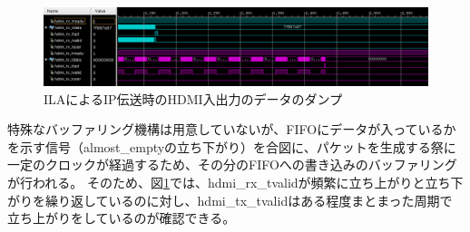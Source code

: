 \begin{figure}[htbp]
  \begin{center}
    \includegraphics[bb=0 0 1199 246,width=15.5cm]{img/fpga-ila-hdmi.png}
  \end{center}
  \caption{ILAによるIP伝送時のHDMI入出力のデータのダンプ}
  \label{fig:fpga-ila-hdmi}
\end{figure}


特殊なバッファリング機構は用意していないが、FIFOにデータが入っているかを示す信号（almost\_emptyの立ち下がり）を合図に、パケットを生成する祭に一定のクロックが経過するため、その分のFIFOへの書き込みのバッファリングが行われる。
そのため、図\ref{fig:fpga-ila-hdmi}では、hdmi\_rx\_tvalidが頻繁に立ち上がりと立ち下がりを繰り返しているのに対し、hdmi\_tx\_tvalidはある程度まとまった周期で立ち上がりをしているのが確認できる。
